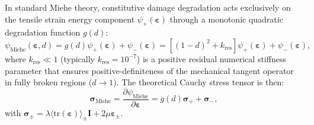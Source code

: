In standard Miehe theory, constitutive damage degradation acts exclusively on the tensile strain energy component $\psi_+(\boldsymbol{\varepsilon})$ through a monotonic quadratic degradation function $g(d)$:
\begin{equation}
\label{eq:constitutive_energy_density_theory}
\psi_{\text{Miehe}}(\boldsymbol{\varepsilon}, d) = g(d) \psi_+(\boldsymbol{\varepsilon}) + \psi_-(\boldsymbol{\varepsilon}) = \left[ (1 - d)^2 + k_{\mathrm{res}} \right] \psi_+(\boldsymbol{\varepsilon}) + \psi_-(\boldsymbol{\varepsilon}),
\end{equation}
where $k_{\mathrm{res}} \ll 1$ (typically $k_{\mathrm{res}} = 10^{-7}$) is a positive residual numerical stiffness parameter that ensures positive-definiteness of the mechanical tangent operator in fully broken regions ($d \to 1$). The theoretical Cauchy stress tensor is then:
\begin{equation}
\label{eq:cauchy_stress_theory}
\boldsymbol{\sigma}_{\text{Miehe}} = \frac{\partial \psi_{\text{Miehe}}}{\partial \boldsymbol{\varepsilon}} = g(d) \boldsymbol{\sigma}_+ + \boldsymbol{\sigma}_-,
\end{equation}
with $\boldsymbol{\sigma}_{\pm} = \lambda \langle \mathrm{tr}(\boldsymbol{\varepsilon}) \rangle_{\pm} \mathbf{I} + 2\mu \boldsymbol{\varepsilon}_{\pm}$.

